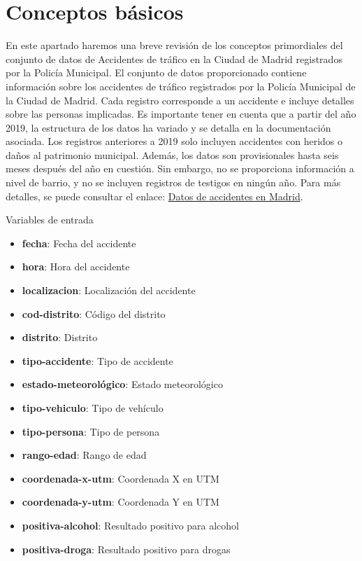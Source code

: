 \section{Conceptos básicos}
En este apartado haremos una breve revisión de los conceptos primordiales del conjunto de datos de Accidentes de tráfico en la Ciudad de Madrid registrados por la Policía Municipal. 
El conjunto de datos proporcionado contiene información sobre los accidentes de tráfico registrados por la Policía Municipal de la Ciudad de Madrid. Cada registro corresponde a un accidente e incluye detalles sobre las personas implicadas. Es importante tener en cuenta que a partir del año 2019, la estructura de los datos ha variado y se detalla en la documentación asociada. Los registros anteriores a 2019 solo incluyen accidentes con heridos o daños al patrimonio municipal. Además, los datos son provisionales hasta seis meses después del año en cuestión. Sin embargo, no se proporciona información a nivel de barrio, y no se incluyen registros de testigos en ningún año. Para más detalles, se puede consultar el enlace: \href{https://datos.madrid.es/portal/site/egob/menuitem.c05c1f754a33a9fbe4b2e4b284f1a5a0/?vgnextoid=7c2843010d9c3610VgnVCM2000001f4a900aRCRD&vgnextchannel=374512b9ace9f310VgnVCM100000171f5a0aRCRD&vgnextfmt=default}{Datos de accidentes en Madrid}.

Variables de entrada
\begin{itemize}
\item \textbf{fecha}: Fecha del accidente
\item \textbf{hora}: Hora del accidente
\item \textbf{localizacion}: Localización del accidente
\item \textbf{cod-distrito}: Código del distrito
\item \textbf{distrito}: Distrito
\item \textbf{tipo-accidente}: Tipo de accidente
\item \textbf{estado-meteorológico}: Estado meteorológico
\item \textbf{tipo-vehiculo}: Tipo de vehículo
\item \textbf{tipo-persona}: Tipo de persona
\item \textbf{rango-edad}: Rango de edad
\item \textbf{coordenada-x-utm}: Coordenada X en UTM
\item \textbf{coordenada-y-utm}: Coordenada Y en UTM
\item \textbf{positiva-alcohol}: Resultado positivo para alcohol
\item \textbf{positiva-droga}: Resultado positivo para drogas
\end{itemize}


